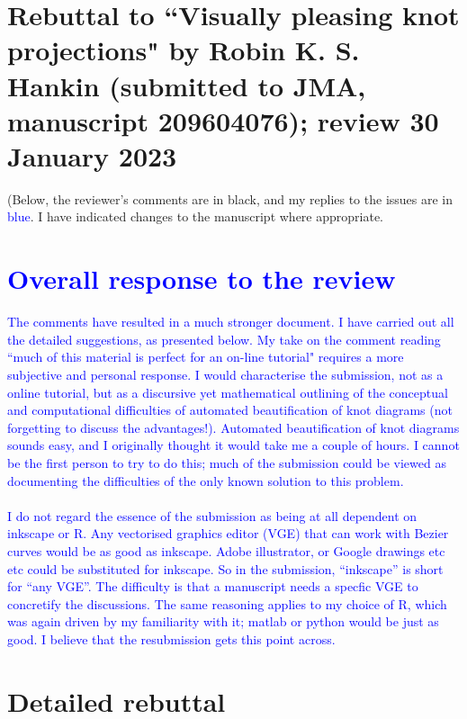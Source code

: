 \documentclass[12pt]{article}
\begin{document}
\section*{Rebuttal to ``Visually pleasing knot projections" by
  Robin K. S. Hankin (submitted to JMA, manuscript 209604076); review
  30 January 2023}

(Below, the reviewer's comments are in black, and my replies to the
issues are in \textcolor{blue}{blue}.  I have indicated changes to the
manuscript where appropriate.

\section*{\textcolor{blue}{Overall response to the review}}

\textcolor{blue}{The comments have resulted in a much stronger
  document.  I have carried out all the detailed suggestions, as
  presented below.  My take on the comment reading ``much of this
  material is perfect for an on-line tutorial" requires a more
  subjective and personal response.  I would characterise the
  submission, not as a online tutorial, but as a discursive yet
  mathematical outlining of the conceptual and computational
  difficulties of automated beautification of knot diagrams (not
  forgetting to discuss the advantages!).  Automated beautification of
  knot diagrams sounds easy, and I originally thought it would take me
  a couple of hours.  I cannot be the first person to try to do this;
  much of the submission could be viewed as documenting the
  difficulties of the only known solution to this problem.\\ \\ I do
  not regard the essence of the submission as being at all dependent
  on inkscape or R.  Any vectorised graphics editor (VGE) that can
  work with Bezier curves would be as good as inkscape.  Adobe
  illustrator, or Google drawings etc etc could be substituted for
  inkscape.  So in the submission, ``inkscape'' is short for ``any
  VGE''.  The difficulty is that a manuscript needs a specfic VGE to
  concretify the discussions.  The same reasoning applies to my choice
  of R, which was again driven by my familiarity with it; matlab or
  python would be just as good.  I believe that the resubmission gets
  this point across.}

\section*{Detailed rebuttal}
\end{document}
